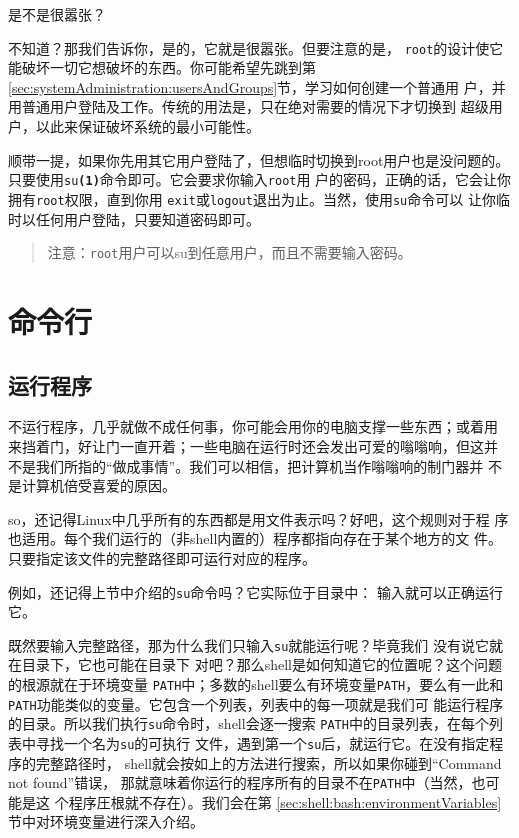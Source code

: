 是不是很嚣张？

不知道？那我们告诉你，是的，它就是很嚣张。但要注意的是，
\texttt{root}的设计使它能破坏一切它想破坏的东西。你可能希望先跳到第
\ref{sec:systemAdministration:usersAndGroups}节，学习如何创建一个普通用
户，并用普通用户登陆及工作。传统的用法是，只在绝对需要的情况下才切换到
超级用户，以此来保证破坏系统的最小可能性。

顺带一提，如果你先用其它用户登陆了，但想临时切换到root用户也是没问题的。
只要使用\texttt{su\textbf{(1)}}命令即可。它会要求你输入\texttt{root}用
户的密码，正确的话，它会让你拥有\texttt{root}权限，直到你用
\texttt{exit}或\texttt{logout}退出为止。当然，使用\texttt{su}命令可以
让你临时以任何用户登陆，只要知道密码即可。

\begin{quote}
  注意：\texttt{root}用户可以su到任意用户，而且不需要输入密码。
\end{quote}


\section{命令行}
\label{sec:shell:commandLine}

\subsection{运行程序}
\label{sec:shell:commandLine:runningPrograms}
不运行程序，几乎就做不成任何事，你可能会用你的电脑支撑一些东西；或着用
来挡着门，好让门一直开着；一些电脑在运行时还会发出可爱的嗡嗡响，但这并
不是我们所指的``做成事情''。我们可以相信，把计算机当作嗡嗡响的制门器并
不是计算机倍受喜爱的原因。

so，还记得Linux中几乎所有的东西都是用文件表示吗？好吧，这个规则对于程
序也适用。每个我们运行的（非shell内置的）程序都指向存在于某个地方的文
件。只要指定该文件的完整路径即可运行对应的程序。

例如，还记得上节中介绍的\texttt{su}命令吗？它实际位于目录中：
输入就可以正确运行它。

既然要输入完整路径，那为什么我们只输入\texttt{su}就能运行呢？毕竟我们
没有说它就在目录下，它也可能在目录下
对吧？那么shell是如何知道它的位置呢？这个问题的根源就在于环境变量
\texttt{PATH}中；多数的shell要么有环境变量\texttt{PATH}，要么有一此和
\texttt{PATH}功能类似的变量。它包含一个列表，列表中的每一项就是我们可
能运行程序的目录。所以我们执行\texttt{su}命令时，shell会逐一搜索
\texttt{PATH}中的目录列表，在每个列表中寻找一个名为\texttt{su}的可执行
文件，遇到第一个\texttt{su}后，就运行它。在没有指定程序的完整路径时，
shell就会按如上的方法进行搜索，所以如果你碰到``Command not found''错误，
那就意味着你运行的程序所有的目录不在\texttt{PATH}中（当然，也可能是这
个程序圧根就不存在）。我们会在第
\ref{sec:shell:bash:environmentVariables}节中对环境变量进行深入介绍。

